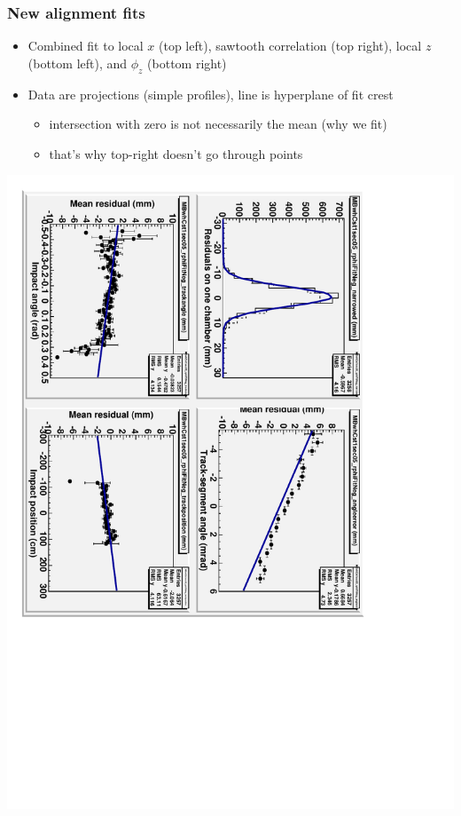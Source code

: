 \documentclass[compress]{beamer}
\begin{document}
\begin{frame}
\frametitle{New alignment fits}

\begin{itemize}
\item Combined fit to local $x$ (top left), sawtooth correlation (top
  right), local $z$ (bottom left), and $\phi_z$ (bottom right)
\item Data are projections (simple profiles), line is hyperplane of fit crest
\begin{itemize}
\item intersection with zero is not necessarily the mean (why we fit)
\item that's why top-right doesn't go through points
\end{itemize}
\end{itemize}

\includegraphics[height=0.7\linewidth, angle=90]{example_fit.pdf}
\end{frame}
\end{document}
